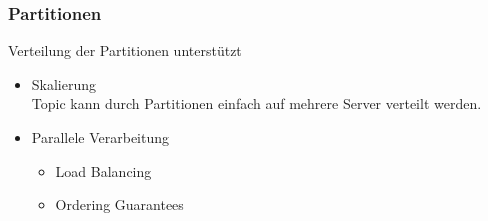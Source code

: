 \begin{frame}
\frametitle{Partitionen}
	Verteilung der Partitionen unterstützt
	\begin{itemize}
		\item Skalierung\\
			Topic kann durch Partitionen einfach auf mehrere Server verteilt werden.
		\item Parallele Verarbeitung
		\begin{itemize}
			\item Load Balancing
			\item Ordering Guarantees
		\end{itemize}
	\end{itemize}
\end{frame}



